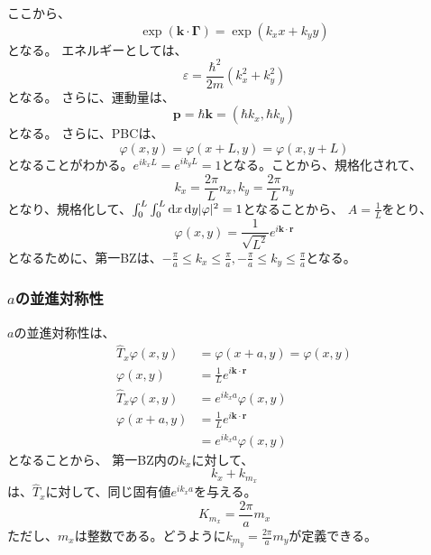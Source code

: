 \documentclass[titlepage]{ltjsarticle}
\begin{document}
ここから、
\begin{equation}
  \exp \left( \bm{k}\cdot \bm{\Gamma} \right) = \exp\left( k_x x + k_y y \right)
\end{equation}
となる。
エネルギーとしては、
\begin{equation}
  \varepsilon = \frac{\hbar^2}{2m}(k_x^2 + k_y^2)
\end{equation}
となる。
さらに、運動量は、
\begin{equation}
  \bm{p} = \hbar \bm{k} = (\hbar k_x, \hbar k_y)
\end{equation}
となる。
さらに、PBCは、
\begin{equation}
  \varphi(x,y) = \varphi(x+L,y) = \varphi(x,y+L)
\end{equation}
となることがわかる。\(e^{ik_xL}=e^{ik_yL}=1\)となる。ことから、規格化されて、
\begin{equation}
  k_x = \frac{2 \pi}{L}n_x, k_y = \frac{2 \pi}{L}n_y
\end{equation}
となり、規格化して、\(\int_{0}^{L}\int_{0}^{L}\odif{x,y}|\varphi|^2 =1\)となることから、
\(A=\frac{1}{L}\)をとり、
\begin{equation}
  \varphi(x,y) = \frac{1}{\sqrt{L^2}}e^{i\bm{k}\cdot \bm{r}}
\end{equation}
となるために、第一BZは、\(-\frac{\pi}{a}\le k_x \le \frac{\pi}{a},-\frac{\pi}{a}\le k_y \le \frac{\pi}{a}\)となる。

\subsubsection{\(a\)の並進対称性}

\(a\)の並進対称性は、
\begin{align}
  \hat{T}_x \varphi(x,y) &= \varphi(x+a,y) = \varphi(x,y) \\
  \varphi(x,y) & = \frac{1}{L}e^{i \bm{k}\cdot \bm{r}}\\
  \hat{T}_x \varphi(x,y) & = e^{ik_x a} \varphi(x,y)\\
  \varphi(x+a,y) & = \frac{1}{L} e^{i \bm{k}\cdot \bm{r}} \\
  & = e^{ik_x a} \varphi(x,y)
\end{align}
となることから、
第一BZ内の\(k_x\)に対して、
\begin{equation}
  k_x + k_{m_x}
\end{equation}
は、\(\hat{T}_x\)に対して、同じ固有値\(e^{ik_x a}\)を与える。
\begin{equation}
  K_{m_x} = \frac{2 \pi}{a}m_x
\end{equation}
ただし、\(m_x\)は整数である。どうように\(k_{m_y}=\frac{2\pi}{a}m_y\)が定義できる。
\end{document}
